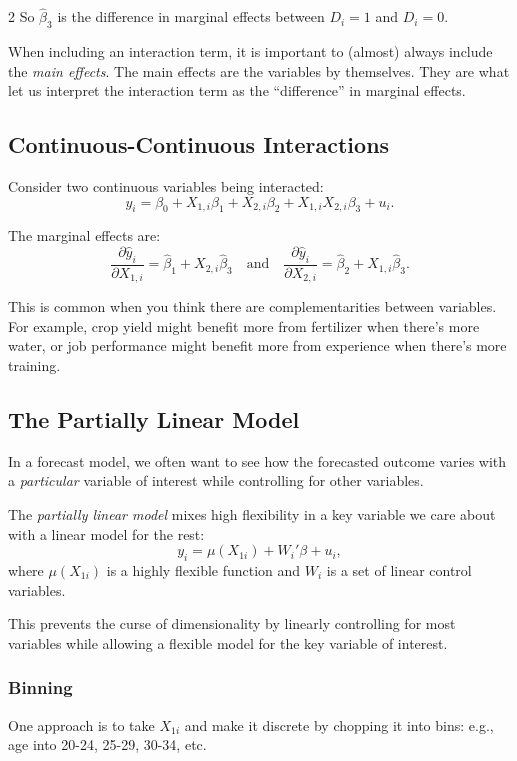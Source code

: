 \documentclass[12pt]{article}
\begin{document}
\begin{multicols}{2}
  So $\hat{\beta}_3$ is the difference in marginal effects between $D_i = 1$ and $D_i = 0$.

  When including an interaction term, it is important to (almost) always include the \emph{main effects}. The main effects are the variables by themselves. They are what let us interpret the interaction term as the ``difference'' in marginal effects.

  \subsection*{Continuous-Continuous Interactions}

  Consider two continuous variables being interacted:
  $$y_i = \beta_0 + X_{1,i} \beta_1 + X_{2,i} \beta_2 + X_{1,i} X_{2,i} \beta_3 + u_i.$$

  The marginal effects are:
  $$\frac{\partial \hat{y}_i}{\partial X_{1,i}} = \hat{\beta}_1 + X_{2,i} \hat{\beta}_3 \quad \text{and} \quad \frac{\partial \hat{y}_i}{\partial X_{2,i}} = \hat{\beta}_2 + X_{1,i} \hat{\beta}_3.$$

  This is common when you think there are complementarities between variables. For example, crop yield might benefit more from fertilizer when there's more water, or job performance might benefit more from experience when there's more training.

  \subsection*{The Partially Linear Model}

  In a forecast model, we often want to see how the forecasted outcome varies with a \emph{particular} variable of interest while controlling for other variables.

  The \emph{partially linear model} mixes high flexibility in a key variable we care about with a linear model for the rest:
  $$y_i = \mu(X_{1i}) + W_i' \beta + u_i,$$
  where $\mu(X_{1i})$ is a highly flexible function and $W_i$ is a set of linear control variables.

  This prevents the curse of dimensionality by linearly controlling for most variables while allowing a flexible model for the key variable of interest.

  \subsubsection*{Binning}

  One approach is to take $X_{1i}$ and make it discrete by chopping it into bins: e.g., age into 20-24, 25-29, 30-34, etc.


\end{multicols}
\end{document}
